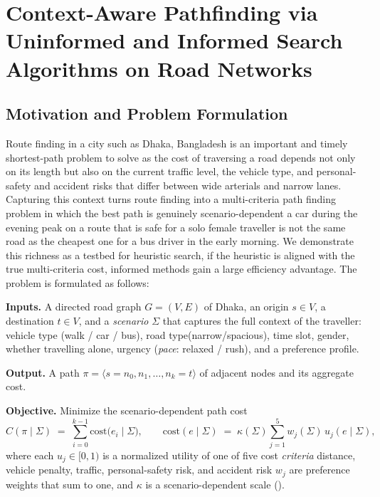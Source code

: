 \documentclass{ai-lab-report}
\begin{document}
\section{Context-Aware Pathfinding via Uninformed and Informed Search Algorithms on Road Networks}
\label{sec:a1}\label{sec:search}

\subsection{Motivation and Problem Formulation}
Route finding in a city such as Dhaka, Bangladesh is an important and timely shortest-path problem to solve as
the cost of traversing a road depends not only on its length but also on the current traffic level, the vehicle type, 
and personal-safety and accident risks that differ between wide arterials and narrow lanes. 
Capturing this context turns route finding into a multi-criteria path finding problem in which the best path 
is genuinely scenario-dependent a car during the evening peak on a route that is safe for a solo female 
traveller is not the same road as the cheapest one for a bus driver in the early morning. We demonstrate
 this richness as a testbed for heuristic search, if the heuristic is aligned with the true multi-criteria cost, 
informed methods gain a large efficiency advantage. The problem is formulated as follows:

\textbf{Inputs.} A directed road graph $G=(V,E)$ of Dhaka, an origin $s\in V$, a destination $t\in V$, and a \emph{scenario} $\Sigma$ 
that captures the full context of the traveller: vehicle type (walk / car / bus), road type(narrow/spacious), time slot, gender, whether travelling alone, urgency (\emph{pace}: relaxed / rush), and a preference profile.

\textbf{Output.} A path $\pi=\langle s=n_0,n_1,\dots,n_k=t\rangle$ of adjacent nodes and its aggregate cost.

\textbf{Objective.} Minimize the scenario-dependent path cost
\begin{equation}
C(\pi\mid\Sigma)\;=\;\sum_{i=0}^{k-1}\mathrm{cost}\big(e_{i}\mid\Sigma\big),
\qquad
\mathrm{cost}(e\mid\Sigma)\;=\;\kappa(\Sigma)\sum_{j=1}^{5} w_j(\Sigma)\,u_j(e\mid\Sigma),
\label{eq:edgecost}
\end{equation}
where each $u_j\in[0,1)$ is a normalized utility of one of five cost \emph{criteria} distance, vehicle penalty, traffic, personal-safety risk, and accident risk $w_j$ are preference weights that sum to one, and $\kappa$ is a scenario-dependent scale ().
\end{document}
